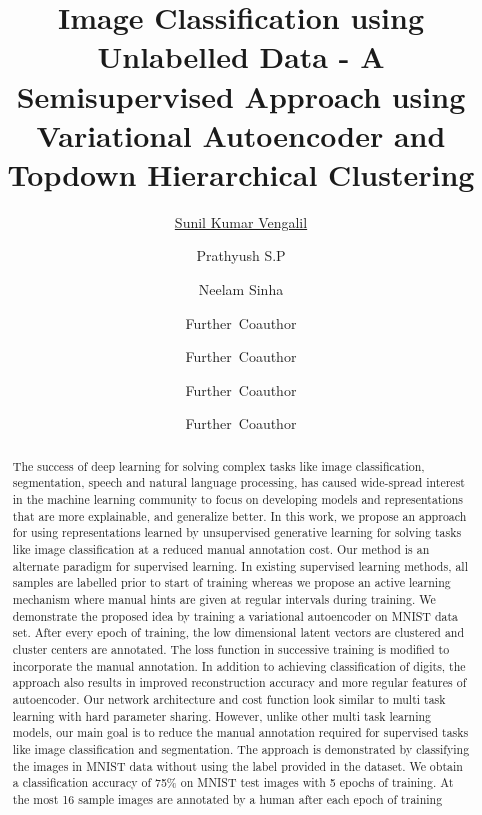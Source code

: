 \documentclass{uai2021} %
\title{Image Classification using Unlabelled Data - A Semisupervised Approach using Variational Autoencoder and Topdown Hierarchical Clustering}
\author[1]{\href{mailto:Sunil Kumar Vengalil <sunilkumar.vengalil@iiitb.org> ?Subject=Your UAI 2021 paper}{Sunil Kumar Vengalil}{}}
\author[2]{Prathyush S.P}
\author[1,2]{Neelam Sinha}
\author[3]{Further~Coauthor}
\author[1]{Further~Coauthor}
\author[3]{Further~Coauthor}
\author[3,1]{Further~Coauthor}
\affil[1]{%
    Computer Science Dept.\\
    Cranberry University\\
    Pittsburgh, Pennsylvania, USA
}
\affil[2]{%
    Affiliation\\
    Address\\
    …
}
\affil[3]{…}
\begin{document}
\maketitle

\begin{abstract}
The success of deep learning for solving complex tasks like image classification, segmentation, speech and natural language processing, has caused wide-spread interest in the machine learning community to focus on developing models and representations that are more explainable, and generalize better.
In this work, we propose an approach for using representations learned by unsupervised generative learning for solving tasks like image classification at a reduced manual annotation cost.
Our method is an alternate paradigm for supervised learning.
In existing supervised learning methods,  all samples are labelled prior to start of training whereas we propose an active learning mechanism where manual hints are given at regular intervals during training.
We demonstrate the proposed idea by training a  variational autoencoder on MNIST data set.
After every epoch of training, the low dimensional latent vectors are clustered and cluster centers are annotated.
The loss function in successive training is modified to incorporate the manual annotation.
In addition to achieving classification of digits, the approach also results in improved reconstruction accuracy and more regular features of autoencoder.
Our network architecture and cost function look similar to multi task learning with hard parameter sharing.
However, unlike other multi task learning models, our main goal is to reduce the manual annotation required for supervised tasks like image classification and segmentation.
The approach is demonstrated by classifying the images in MNIST data without using the label provided in the dataset.
We obtain a classification accuracy of 75\% on MNIST test images with 5 epochs of training.
At the most 16 sample images are annotated by a human after each epoch of training
\end{abstract}
\end{document}
